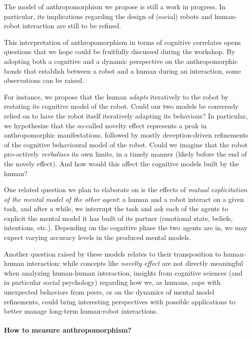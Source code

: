 \documentclass{frontiersSCNS} %
\begin{document}
The model of anthropomorphism we propose is still a work in progress. In
particular, its implications regarding the design of (social) robots and
human-robot interaction are still to be refined.

This interpretation of anthropomorphism in terms of cognitive correlates opens
questions that we hope could be fruitfully discussed during the workshop.  By
adopting both a cognitive and a dynamic perspective on the anthropomorphic bonds
that establish between a robot and a human during an interaction, some
observations can be raised.

For instance, we propose that the human \emph{adapts} iteratively to the robot
by restating its cognitive model of the robot. Could our two models be
conversely relied on to have the robot itself iteratively adapting its
behaviour? In particular, we hypothesize that the so-called novelty effect
represents a peak in anthropomorphic manifestations, followed by mostly
deception-driven refinements of the cognitive behavioural model of the robot.
Could we imagine that the robot pro-actively \emph{verbalises} its own limits,
in a timely manner (likely before the end of the novely effect). And how would
this affect the cognitive models built by the human?

One related question we plan to elaborate on is the effects of \emph{mutual
explicitation of the mental model of the other agent}: a human and a robot
interact on a given task, and after a while, we interrupt the task and ask each
of the agents to explicit the mental model it has built of its partner
(emotional state, beliefs, intentions, etc.). Depending on the cognitive phase
the two agents are in, we may expect varying accuracy levels in the produced
mental models.

Another question raised by these models relates to their transposition to
human-human interaction: while concepts like \emph{novelty effect} are not
directly meaningful when analyzing human-human interaction, insights from
cognitive sciences (and in particular social psychology) regarding how we, as
humans, cope with unexpected behaviors from peers, or on the dynamics of mental
model refinements, could bring interesting perspectives with possible
applications to better manage long-term human-robot interactions.

\paragraph*{How to measure anthropomorphism?}
\end{document}
